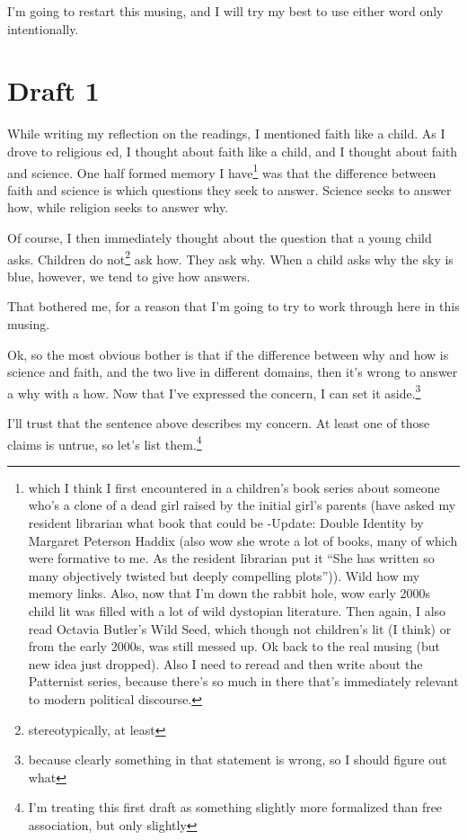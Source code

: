 \documentclass[12pt]{article}[titlepage]
\newcommand{\say}[1]{``#1''}
\renewcommand{\,}{\textsuperscript{,}}
\begin{document}
I'm going to restart this musing, and I will try my best to use either word only intentionally.
\section{Draft 1}
While writing my reflection on the readings, I mentioned faith like a child.
As I drove to religious ed, I thought about faith like a child, and I thought about faith and science.
One half formed memory I have\footnote{which I think I first encountered in a children's book series about someone who's a clone of a dead girl raised by the initial girl's parents (have asked my resident librarian what book that could be -Update: Double Identity by Margaret Peterson Haddix (also wow she wrote a lot of books, many of which were formative to me. As the resident librarian put it \say{She has written so many objectively twisted but deeply compelling plots})). Wild how my memory links. Also, now that I'm down the rabbit hole, wow early 2000s child lit was filled with a lot of wild dystopian literature. Then again, I also read Octavia Butler's Wild Seed, which though not children's lit (I think) or from the early 2000s, was still messed up. Ok back to the real musing (but new idea just dropped). Also I need to reread and then write about the Patternist series, because there's so much in there that's immediately relevant to modern political discourse.} was that the difference between faith and science is which questions they seek to answer.
Science seeks to answer how, while religion seeks to answer why.

Of course, I then immediately thought about the question that a young child asks.
Children do not\footnote{stereotypically, at least} ask how.
They ask why.
When a child asks why the sky is blue, however, we tend to give how answers.

That bothered me, for a reason that I'm going to try to work through here in this musing.

Ok, so the most obvious bother is that if the difference between why and how is science and faith, and the two live in different domains, then it's wrong to answer a why with a how.
Now that I've expressed the concern, I can set it aside.\footnote{because clearly something in that statement is wrong, so I should figure out what}

I'll trust that the sentence above describes my concern.
At least one of those claims is untrue, so let's list them.\footnote{I'm treating this first draft as something slightly more formalized than free association, but only slightly}
\end{document}
